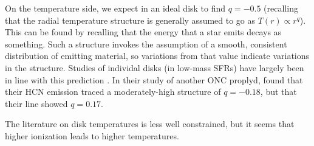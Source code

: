 





On the temperature side, we expect in an ideal disk to find $q=-0.5$ (recalling that the radial temperature structure is generally assumed to go as $T(r) \propto r^{q}$). This can be found by recalling that the energy that a star emits decays as something. Such a structure invokes the assumption of a smooth, consistent distribution of emitting material, so variations from that value indicate variations in the structure. Studies of individal disks (in low-mass SFRs) have largely been in line with this prediction \citep[e.g. ][, whose values range from -0.22 to -0.7]{Dartois2003,Panic2008,Panic2010,Hughes2008,Qi2003,Qi2004,Isella2007,Rosenfeld2012,Flaherty2015,Flaherty2017,Zhang2017,Flaherty2018}. In their study of another ONC proplyd, \citet{Factor2017} found that their HCN emission traced a moderately-high structure of $q=-0.18$, but that their \hco line showed $q=0.17$.


The literature on disk temperatures is less well constrained, but it seems that higher ionization leads to higher temperatures.






